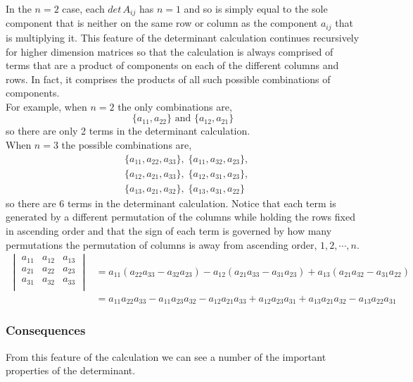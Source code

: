 \documentclass[../MathsNotesBase.tex]{subfiles}
\begin{document}
{		In the $n = 2$ case, each $det\, A_{ij}$ has $n = 1$ and so is simply equal to the sole component that is neither on the same row or column as the component $a_{ij}$ that is multiplying it. This feature of the determinant calculation continues recursively for higher dimension matrices so that the calculation is always comprised of terms that are a product of components on each of the different columns and rows. In fact, it comprises the products of all such possible combinations of components.\\
		For example, when $n = 2$ the only combinations are,
		\[ \{a_{11}, a_{22}\} \text{ and } \{a_{12}, a_{21}\} \]
		so there are only 2 terms in the determinant calculation.\\
		When $n = 3$ the possible combinations are,
		\begin{align*}
			&\{a_{11}, a_{22}, a_{33}\},\; \{a_{11}, a_{32}, a_{23}\},\\
			&\{a_{12}, a_{21}, a_{33}\},\; \{a_{12}, a_{31}, a_{23}\},\\
			&\{a_{13}, a_{21}, a_{32}\},\; \{a_{13}, a_{31}, a_{22}\} 
		\end{align*}
		so there are 6 terms in the determinant calculation. Notice that each term is generated by a different permutation of the columns while holding the rows fixed in ascending order and that the sign of each term is governed by how many permutations the permutation of columns is away from ascending order, $1,2,\cdots,n$.
		\begin{align*}
		\begin{vmatrix}    
			a_{11}  &  a_{12} & a_{13} \\
			a_{21}  &  a_{22} & a_{23} \\
			a_{31}  &  a_{32} & a_{33} \\		
		\end{vmatrix}
		&= a_{11}(a_{22}a_{33} - a_{32}a_{23}) - a_{12}(a_{21}a_{33} - a_{31}a_{23}) + a_{13}(a_{21}a_{32} - a_{31}a_{22}) \\
		&= a_{11}a_{22}a_{33} - a_{11}a_{23}a_{32} - a_{12}a_{21}a_{33} + a_{12}a_{23}a_{31} + a_{13}a_{21}a_{32} - a_{13}a_{22}a_{31}
		\end{align*}
		
		\subsubsection{Consequences}
		From this feature of the calculation we can see a number of the important properties of the determinant.
		
}
\end{document}
